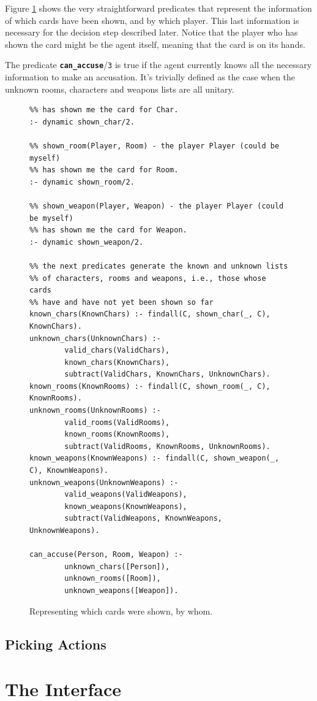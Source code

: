 \documentclass[12pt,a4paper]{article}
\newcommand{\varname}[1]{\texttt{#1}}
\newcommand{\varnamebf}[1]{\textbf{\texttt{#1}}}
\newcommand{\predprot}[2]{{\color{MidnightBlue}\varnamebf{#1}}/{\color{Mulberry}\varname{#2}}}
\begin{document}
Figure \ref{fig:shown-cards} shows the very straightforward predicates that represent the information of which cards have been shown, and by which player. This last information is necessary for the decision step described later. Notice that the player who has shown the card might be the agent itself, meaning that the card is on its hands.

The predicate \predprot{can\_accuse}{3} is true if the agent currently knows all the necessary information to make an accusation. It's trivially defined as the case when the unknown rooms, characters and weapons lists are all unitary.

\begin{figure}[H]
	\centering
\begin{lstlisting}[style=Prolog-pygsty]
%% shown_char(Player, Char) - the player Player (could be myself)
%% has shown me the card for Char.
:- dynamic shown_char/2.

%% shown_room(Player, Room) - the player Player (could be myself)
%% has shown me the card for Room.
:- dynamic shown_room/2.

%% shown_weapon(Player, Weapon) - the player Player (could be myself)
%% has shown me the card for Weapon.
:- dynamic shown_weapon/2.

%% the next predicates generate the known and unknown lists
%% of characters, rooms and weapons, i.e., those whose cards
%% have and have not yet been shown so far
known_chars(KnownChars) :- findall(C, shown_char(_, C), KnownChars).
unknown_chars(UnknownChars) :-
		valid_chars(ValidChars),
		known_chars(KnownChars),
		subtract(ValidChars, KnownChars, UnknownChars).
known_rooms(KnownRooms) :- findall(C, shown_room(_, C), KnownRooms).
unknown_rooms(UnknownRooms) :-
		valid_rooms(ValidRooms),
		known_rooms(KnownRooms),
		subtract(ValidRooms, KnownRooms, UnknownRooms).
known_weapons(KnownWeapons) :- findall(C, shown_weapon(_, C), KnownWeapons).		
unknown_weapons(UnknownWeapons) :-
		valid_weapons(ValidWeapons),
		known_weapons(KnownWeapons),
		subtract(ValidWeapons, KnownWeapons, UnknownWeapons).

can_accuse(Person, Room, Weapon) :-
		unknown_chars([Person]),
		unknown_rooms([Room]),
		unknown_weapons([Weapon]).
\end{lstlisting}
	\caption{Representing which cards were shown, by whom.} 
	\label{fig:shown-cards}
\end{figure}

\subsection{Picking Actions}
\label{sec:actions}

\section{The Interface}
\label{sec:interface}
\end{document}
